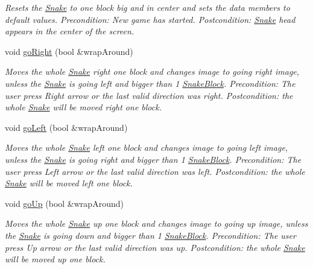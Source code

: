 \begin{DoxyCompactItemize}
\begin{DoxyCompactList}\small\item\em \-Resets the \hyperlink{classSnake}{\-Snake} to one block big and in center and sets the data members to default values. \-Precondition\-: \-New game has started. \-Postcondition\-: \hyperlink{classSnake}{\-Snake} head appears in the center of the screen. \end{DoxyCompactList}\item 
void \hyperlink{classSnake_a1142c1242116333d25b86a692c5cb73d}{go\-Right} (bool \&wrap\-Around)
\begin{DoxyCompactList}\small\item\em \-Moves the whole \hyperlink{classSnake}{\-Snake} right one block and changes image to going right image, unless the \hyperlink{classSnake}{\-Snake} is going left and bigger than 1 \hyperlink{classSnakeBlock}{\-Snake\-Block}. \-Precondition\-: \-The user press \-Right arrow or the last valid direction was right. \-Postcondition\-: the whole \hyperlink{classSnake}{\-Snake} will be moved right one block. \end{DoxyCompactList}\item 
void \hyperlink{classSnake_a9dd8827f9459d6006cdac807c0366b1e}{go\-Left} (bool \&wrap\-Around)
\begin{DoxyCompactList}\small\item\em \-Moves the whole \hyperlink{classSnake}{\-Snake} left one block and changes image to going left image, unless the \hyperlink{classSnake}{\-Snake} is going right and bigger than 1 \hyperlink{classSnakeBlock}{\-Snake\-Block}. \-Precondition\-: \-The user press \-Left arrow or the last valid direction was left. \-Postcondition\-: the whole \hyperlink{classSnake}{\-Snake} will be moved left one block. \end{DoxyCompactList}\item 
void \hyperlink{classSnake_a3ad73edf3dddabb0848bf9981f81089c}{go\-Up} (bool \&wrap\-Around)
\begin{DoxyCompactList}\small\item\em \-Moves the whole \hyperlink{classSnake}{\-Snake} up one block and changes image to going up image, unless the \hyperlink{classSnake}{\-Snake} is going down and bigger than 1 \hyperlink{classSnakeBlock}{\-Snake\-Block}. \-Precondition\-: \-The user press \-Up arrow or the last valid direction was up. \-Postcondition\-: the whole \hyperlink{classSnake}{\-Snake} will be moved up one block. \end{DoxyCompactList}\item 

\end{DoxyCompactItemize}
